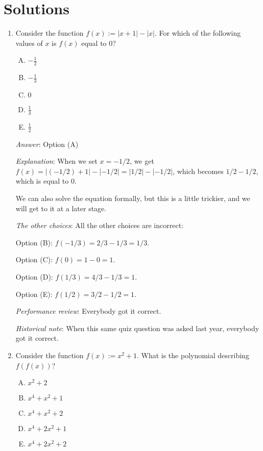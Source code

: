\documentclass[10pt]{amsart}
\begin{document}
\section{Solutions}
\begin{enumerate}

\item Consider the function $f(x) := |x + 1| - |x|$. For which of the
  following values of $x$ is $f(x)$ equal to $0$?

  \begin{enumerate}[(A)]
  \item $-\frac{1}{2}$
  \item $-\frac{1}{3}$
  \item $0$
  \item $\frac{1}{3}$
  \item $\frac{1}{2}$
  \end{enumerate}

  {\em Answer}: Option (A)

  {\em Explanation}: When we set $x = -1/2$, we get $f(x) = |(-1/2) +
  1| - |-1/2| = |1/2| - |-1/2|$, which becomes $1/2 - 1/2$, which is
  equal to $0$.

  We can also solve the equation formally, but this is a little
  trickier, and we will get to it at a later stage.

 {\em The other choices}: All the other choices are incorrect:

  Option (B): $f(-1/3) = 2/3 - 1/3 = 1/3$.

  Option (C): $f(0) = 1 - 0 = 1$.

  Option (D): $f(1/3) = 4/3 - 1/3 = 1$.

  Option (E): $f(1/2) = 3/2 - 1/2 = 1$.

  {\em Performance review}: Everybody got it correct.

  {\em Historical note}: When this same quiz question was asked last
  year, everybody got it correct.

\item Consider the function $f(x) := x^2 + 1$. What is the polynomial
  describing $f(f(x))$?

  \begin{enumerate}[(A)]
  \item $x^2 + 2$
  \item $x^4 + x^2 + 1$
  \item $x^4 + x^2 + 2$
  \item $x^4 + 2x^2 + 1$
  \item $x^4 + 2x^2 + 2$
  \end{enumerate}


\end{enumerate}
\end{document}
